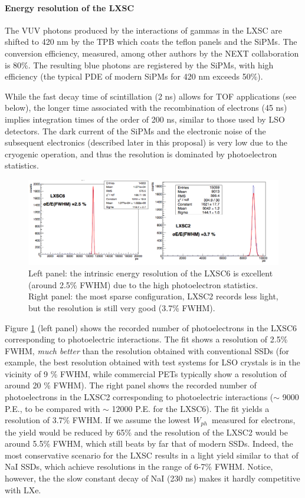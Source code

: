 \paragraph{Energy resolution of the LXSC}

The VUV photons produced by the interactions of gammas in the LXSC are shifted to 420 nm by the TPB which coats the teflon panels and the SiPMs. The conversion efficiency, measured, among other authors by the NEXT collaboration is 80\%. The resulting blue photons are registered by the SiPMs, with high efficiency (the typical PDE of modern SiPMs for 420 nm exceeds 50\%). 

While the fast decay time of scintillation (2 ns) allows for TOF applications (see below), the longer time associated with the recombination of electrons (45 ns) implies integration times of the order of 200 ns, similar to those used by LSO detectors. The dark current of the SiPMs and the electronic noise of the subsequent electronics (described later in this proposal) is very low due to the cryogenic operation, and thus the resolution is dominated by photoelectron statistics. 

\begin{figure}[!htb]
	\centering
	\includegraphics[scale=0.5]{img/energyResolution.png}
	\caption{\label{fig.energy}  Left panel: the intrinsic energy resolution of the LXSC6 is excellent (around 2.5\% FWHM) due to the high photoelectron statistics. Right panel: the most sparse configuration, LXSC2 records less light, but the resolution is still very good (3.7\% FWHM). }
\end{figure}

Figure \ref{fig.energy} (left panel) shows the recorded number of photoelectrons in the LXSC6 corresponding to photoelectric interactions. The fit shows a resolution of 2.5\% FWHM, {\em much better} than the resolution obtained with conventional SSDs (for example, the best resolution obtained with test systems for LSO crystals is in the vicinity of 9 \% FWHM, while commercial PETs typically show a resolution of around 20 \% FWHM). The right panel shows the recorded number of photoelectrons in the LXSC2 corresponding to photoelectric interactions ($\sim$ 9000 P.E., to be compared with $\sim$ 12000 P.E. for the LXSC6). The  fit yields a resolution of 3.7\% FWHM. If we assume the lowest $W_{ph}$~measured for electrons, the yield would be reduced by 65\% and the resolution of the LXSC2 would be around 5.5\% FWHM, which still beats by far that of modern SSDs. Indeed, the most conservative scenario for the LXSC results in a light yield similar to that of NaI SSDs, which achieve resolutions in the range of 6-7\% FWHM. Notice, however, the the slow constant decay of NaI (230 ns) makes it hardly competitive with LXe. 

